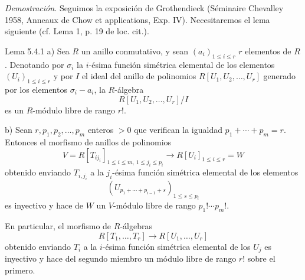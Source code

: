 \emph{Demostración.} Seguimos la exposición de Grothendieck (Séminaire Chevalley 1958, Anneaux de Chow et applications, Exp. IV). Necesitaremos el lema siguiente (cf. Lema 1, p. 19 de loc. cit.).

\begin{statement}{Lema 5.4.1}
a) Sea $R$ un anillo conmutativo, y sean $(a_i)_{1\le i\le r}$ $r$ elementos de $R$. Denotando por $\sigma_i$ la $i$-ésima función simétrica elemental de los elementos $(U_i)_{1\le i\le r}$ y por $I$ el ideal del anillo de polinomios $R[U_1,U_2,\ldots,U_r]$ generado por los elementos $\sigma_i-a_i$, la $R$-álgebra
\[
R[U_1,U_2,\ldots,U_r]/I
\]
es un $R$-módulo libre de rango $r!$.

b) Sean $r,p_1,p_2,\ldots,p_m$ enteros $>0$ que verifican la igualdad $p_1+\cdots+p_m=r$. Entonces el morfismo de anillos de polinomios
\[
V=R[T_{ij_i}]_{1\le i\le m,\,1\le j_i\le p_i}
\longrightarrow R[U_i]_{1\le i\le r}=W
\]
obtenido enviando $T_{i,j_i}$ a la $j_i$-ésima función simétrica elemental de los elementos
\[
(U_{p_1+\cdots+p_{i-1}+s})_{1\le s\le p_i}
\]
es inyectivo y hace de $W$ un $V$-módulo libre de rango $p_1!\cdots p_m!$.

En particular, el morfismo de $R$-álgebras
\[
R[T_1,\ldots,T_r]\to R[U_1,\ldots,U_r]
\]
obtenido enviando $T_i$ a la $i$-ésima función simétrica elemental de los $U_j$ es inyectivo y hace del segundo miembro un módulo libre de rango $r!$ sobre el primero.
\end{statement}
